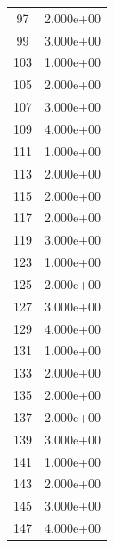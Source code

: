 \documentclass[12pt]{article}
\begin{document}
\begin{longtable}{@{}cc@{}}
97 & 2.000e+00 \\
99 & 3.000e+00 \\
103 & 1.000e+00 \\
105 & 2.000e+00 \\
107 & 3.000e+00 \\
109 & 4.000e+00 \\
111 & 1.000e+00 \\
113 & 2.000e+00 \\
115 & 2.000e+00 \\
117 & 2.000e+00 \\
119 & 3.000e+00 \\
123 & 1.000e+00 \\
125 & 2.000e+00 \\
127 & 3.000e+00 \\
129 & 4.000e+00 \\
131 & 1.000e+00 \\
133 & 2.000e+00 \\
135 & 2.000e+00 \\
137 & 2.000e+00 \\
139 & 3.000e+00 \\
141 & 1.000e+00 \\
143 & 2.000e+00 \\
145 & 3.000e+00 \\
147 & 4.000e+00 \\

\bottomrule
\end{longtable}
\end{document}
